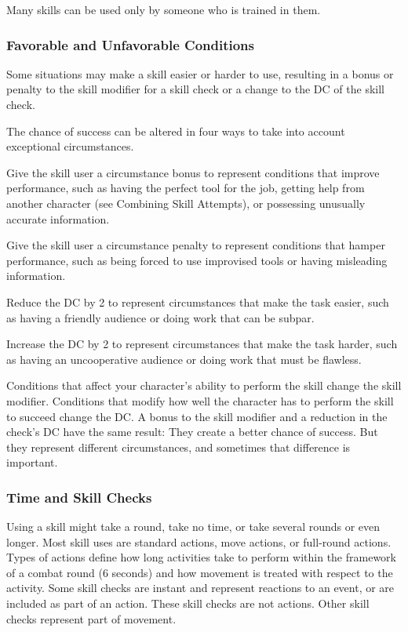 Many skills can be used only by someone who is trained in them.

\subsubsection{Favorable and Unfavorable Conditions}
Some situations may make a skill easier or harder to use, resulting in a bonus or penalty to the skill modifier for a skill check or a change to the DC of the skill check.

The chance of success can be altered in four ways to take into account exceptional circumstances.
\begin{enumerate*}
\item Give the skill user a  circumstance bonus to represent conditions that improve performance, such as having the perfect tool for the job, getting help from another character (see Combining Skill Attempts), or possessing unusually accurate information.
\item Give the skill user a  circumstance penalty to represent conditions that hamper performance, such as being forced to use improvised tools or having misleading information.
\item Reduce the DC by 2 to represent circumstances that make the task easier, such as having a friendly audience or doing work that can be subpar.
\item  Increase the DC by 2 to represent circumstances that make the task harder, such as having an uncooperative audience or doing work that must be flawless.
\end{enumerate*}

Conditions that affect your character's ability to perform the skill change the skill modifier. Conditions that modify how well the character has to perform the skill to succeed change the DC. A bonus to the skill modifier and a reduction in the check's DC have the same result: They create a better chance of success. But they represent different circumstances, and sometimes that difference is important.

\subsubsection{Time and Skill Checks}
Using a skill might take a round, take no time, or take several rounds or even longer. Most skill uses are standard actions, move actions, or full-round actions. Types of actions define how long activities take to perform within the framework of a combat round (6 seconds) and how movement is treated with respect to the activity. Some skill checks are instant and represent reactions to an event, or are included as part of an action. These skill checks are not actions. Other skill checks represent part of movement.

